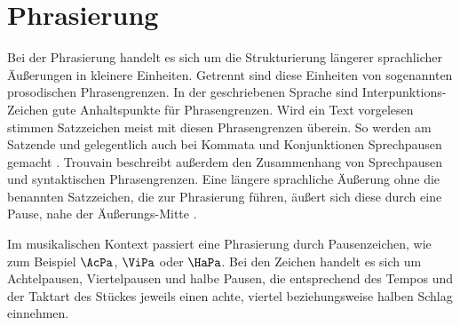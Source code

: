 








\section{Phrasierung}
\label{sec:Phrasierung}

Bei der Phrasierung handelt es sich um die Strukturierung längerer sprachlicher Äußerungen in kleinere Einheiten. Getrennt sind diese Einheiten von sogenannten prosodischen Phrasengrenzen. In der geschriebenen Sprache sind Interpunktions-Zeichen gute Anhaltspunkte für Phrasengrenzen. Wird ein Text vorgelesen stimmen Satzzeichen meist mit diesen Phrasengrenzen überein. So werden am Satzende und gelegentlich auch bei Kommata und Konjunktionen Sprechpausen gemacht \cite{trouvain2018}. Trouvain beschreibt außerdem den Zusammenhang von Sprechpausen und syntaktischen Phrasengrenzen. Eine längere sprachliche Äußerung ohne die benannten Satzzeichen, die zur Phrasierung führen, äußert sich diese durch eine Pause, nahe der Äußerungs-Mitte \cite{gee1983performance}.

Im musikalischen Kontext passiert eine Phrasierung durch Pausenzeichen, wie zum Beispiel $\AcPa$, $\ViPa$ oder $\HaPa$. Bei den Zeichen handelt es sich um Achtelpausen, Viertelpausen und halbe Pausen, die entsprechend des Tempos und der Taktart des Stückes jeweils einen achte, viertel beziehungsweise halben Schlag einnehmen.